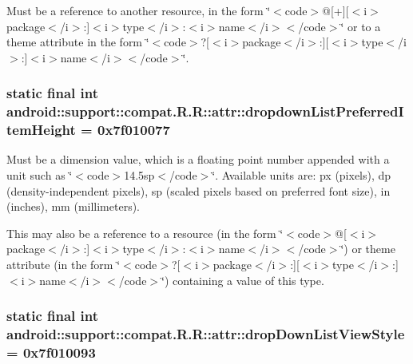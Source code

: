 Must be a reference to another resource, in the form \char`\"{}$<$code$>$@\mbox{[}+\mbox{]}\mbox{[}$<$i$>$package$<$/i$>$:\mbox{]}$<$i$>$type$<$/i$>$:$<$i$>$name$<$/i$>$$<$/code$>$\char`\"{} or to a theme attribute in the form \char`\"{}$<$code$>$?\mbox{[}$<$i$>$package$<$/i$>$:\mbox{]}\mbox{[}$<$i$>$type$<$/i$>$:\mbox{]}$<$i$>$name$<$/i$>$$<$/code$>$\char`\"{}. \hypertarget{classandroid_1_1support_1_1compat_1_1_r_1_1attr_d94fa5ceb50a2d205494dc005d04cfac}{
\subsubsection[{dropdownListPreferredItemHeight}]{\setlength{\rightskip}{0pt plus 5cm}static final int android::support::compat.R.R::attr::dropdownListPreferredItemHeight = 0x7f010077}}
\label{classandroid_1_1support_1_1compat_1_1_r_1_1attr_d94fa5ceb50a2d205494dc005d04cfac}


Must be a dimension value, which is a floating point number appended with a unit such as \char`\"{}$<$code$>$14.5sp$<$/code$>$\char`\"{}. Available units are: px (pixels), dp (density-independent pixels), sp (scaled pixels based on preferred font size), in (inches), mm (millimeters). 

This may also be a reference to a resource (in the form \char`\"{}$<$code$>$@\mbox{[}$<$i$>$package$<$/i$>$:\mbox{]}$<$i$>$type$<$/i$>$:$<$i$>$name$<$/i$>$$<$/code$>$\char`\"{}) or theme attribute (in the form \char`\"{}$<$code$>$?\mbox{[}$<$i$>$package$<$/i$>$:\mbox{]}\mbox{[}$<$i$>$type$<$/i$>$:\mbox{]}$<$i$>$name$<$/i$>$$<$/code$>$\char`\"{}) containing a value of this type. \hypertarget{classandroid_1_1support_1_1compat_1_1_r_1_1attr_a2b9e57406c5d4438999e0555c6f48b0}{
\subsubsection[{dropDownListViewStyle}]{\setlength{\rightskip}{0pt plus 5cm}static final int android::support::compat.R.R::attr::dropDownListViewStyle = 0x7f010093}}
\label{classandroid_1_1support_1_1compat_1_1_r_1_1attr_a2b9e57406c5d4438999e0555c6f48b0}


